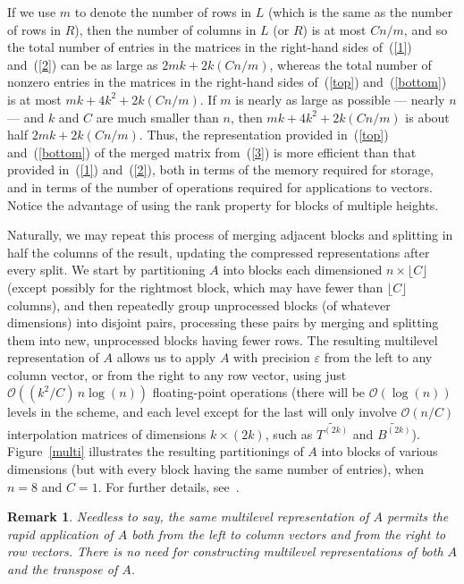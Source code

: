 \documentclass[final,3p,times]{elsarticle}
\def\epsilon{\varepsilon}
\def\bigoh{\mathcal{O}}
\newtheorem{remark1}[theorem]{Remark}
\newenvironment{remark}{\begin{remark1}\rm}{\end{remark1}}
\begin{document}
If we use $m$ to denote the number of rows in $L$ (which is the same
as the number of rows in $R$),
then the number of columns in $L$ (or $R$) is at most $Cn/m$,
and so the total number of entries in the matrices
in the right-hand sides of~(\ref{1}) and~(\ref{2})
can be as large as $2mk + 2k(Cn/m)$,
whereas the total number of nonzero entries in the matrices
in the right-hand sides of~(\ref{top}) and~(\ref{bottom})
is at most $mk + 4k^2 + 2k(Cn/m)$.
If $m$ is nearly as large as possible --- nearly $n$ ---
and $k$ and $C$ are much smaller than $n$,
then $mk + 4k^2 + 2k(Cn/m)$ is about half $2mk + 2k(Cn/m)$.
Thus, the representation provided in~(\ref{top}) and~(\ref{bottom})
of the merged matrix from~(\ref{3})
is more efficient than that provided in~(\ref{1}) and~(\ref{2}),
both in terms of the memory required for storage,
and in terms of the number of operations required for applications to vectors.
Notice the advantage of using the rank property for blocks of multiple heights.

Naturally, we may repeat this process of merging adjacent blocks
and splitting in half the columns of the result,
updating the compressed representations after every split.
We start by partitioning $A$ into blocks
each dimensioned $n \times \lfloor C \rfloor$
(except possibly for the rightmost block, which may have fewer 
than $\lfloor C \rfloor$ columns),
and then repeatedly group unprocessed blocks (of whatever dimensions)
into disjoint pairs, processing these pairs by merging and splitting them
into new, unprocessed blocks having fewer rows.
The resulting multilevel representation of $A$ allows us to apply $A$
with precision $\epsilon$
from the left to any column vector, or from the right to any row vector,
using just $\bigoh((k^2/C) \, n \log(n))$ floating-point operations
(there will be $\bigoh(\log(n))$ levels in the scheme,
and each level except for the last
will only involve $\bigoh(n/C)$ interpolation matrices
of dimensions $k \times (2k)$,
such as $\widetilde{T^{(2k)}}$ and $\widetilde{B^{(2k)}}$).
Figure~\ref{multi} illustrates the resulting partitionings of $A$ into blocks
of various dimensions (but with every block having the same number of entries),
when $n = 8$ and $C = 1$.
For further details, see~\cite{oneil-woolfe-rokhlin}.

\begin{remark}
Needless to say, the same multilevel representation of $A$
permits the rapid application of $A$ both from the left to column vectors
and from the right to row vectors.
There is no need for constructing multilevel representations
of both $A$ and the transpose of $A$.
\end{remark}
\end{document}
